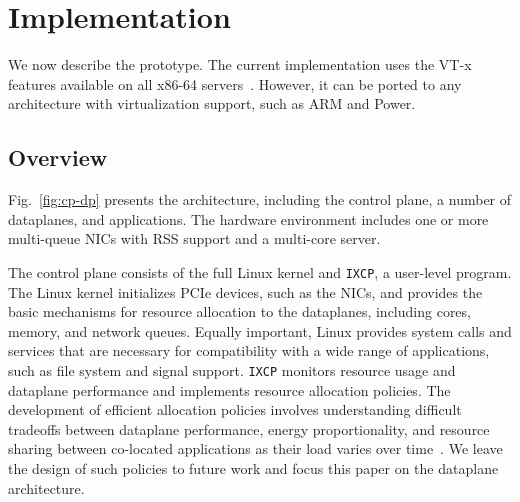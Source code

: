 
\section{\ix Implementation}
\label{sec:impl}



We now describe the \ix prototype.  The current implementation uses
the VT-x features available on all x86-64
servers~\cite{DBLP:journals/computer/UhligNRSMABKLS05}. However, it can
be ported to any architecture with virtualization support, such as ARM
and Power.




\subsection{Overview}
\label{sec:impl:overview}

Fig.~\ref{fig:cp-dp} presents the \ix architecture, including the
control plane, a number of dataplanes, and applications. The hardware
environment includes one or more multi-queue NICs with RSS support and
a multi-core server.

The \ix control plane consists of the full Linux kernel and
\texttt{IXCP}, a user-level program. The Linux kernel initializes PCIe
devices, such as the NICs, and provides the basic mechanisms for
resource allocation to the dataplanes, including cores, memory, and
network queues. Equally important, Linux provides system calls and
services that are necessary for compatibility with a wide range of
applications, such as file system and signal support. \texttt{IXCP}
monitors resource usage and dataplane performance and implements
resource allocation policies. The development of efficient allocation
policies involves understanding difficult tradeoffs between dataplane
performance, energy proportionality, and resource sharing between
co-located applications as their load varies over
time~\cite{Leverich:RHSU:2014,Lo:2014:TWE}. We leave the design of
such policies to future work and focus this paper on the \ix dataplane
architecture.

